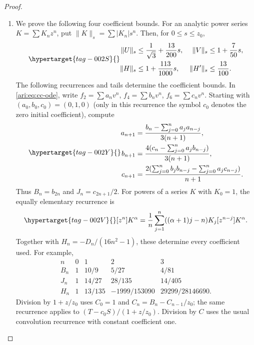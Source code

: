 \begin{proof}
\begin{enumerate}[label=\arabic*.,leftmargin=*]
\item We prove the following four coefficient bounds. For an analytic
power series $K=\sum K_nz^n$, put
$\|K\|_s=\sum|K_n|s^n$. Then, for $0\le s\le z_0$,
\begin{equation}\hypertarget{tag-002S}{}\label{ari:eq:cc-norms}
 \begin{aligned}
 \|U\|_s&\le\frac1{\sqrt3}+\frac{13}{200}s,&
 \|V\|_s&\le1+\frac7{50}s,\\
 \|H\|_s&\le1+\frac{113}{1000}s,&
 \|H'\|_s&\le\frac{13}{100}.
 \end{aligned}
\end{equation}
The following recurrences and tails determine the coefficient
bounds. In
\eqref{ari:eq:cc-ode}, write $f_2=\sum a_nv^n$,
$f_4=\sum b_nv^n$, $f_6=\sum c_nv^n$. Starting with
$(a_0,b_0,c_0)=(0,1,0)$ (only in this recurrence the symbol
$c_0$ denotes the zero initial coefficient), compute
\begin{equation}\hypertarget{tag-002Y}{}\label{ari:eq:cc-recurrence}
 \begin{aligned}
 a_{n+1}&=\frac{b_n-\sum_{j=0}^na_ja_{n-j}}{3(n+1)},\\
 b_{n+1}&=\frac{4(c_n-\sum_{j=0}^na_jb_{n-j})}{3(n+1)},\\
 c_{n+1}&=\frac{2(\sum_{j=0}^nb_jb_{n-j}-
                          \sum_{j=0}^na_jc_{n-j})}{n+1}.
 \end{aligned}
\end{equation}
Thus $B_n=b_{2n}$ and $J_n=c_{2n+1}/2$. For powers of a series
$K$ with $K_0=1$, the equally elementary recurrence is
\begin{equation}\hypertarget{tag-002V}{}\label{ari:eq:cc-power}
 [z^n]K^\alpha=\frac1n\sum_{j=1}^n
                 ((\alpha+1)j-n)K_j[z^{n-j}]K^\alpha.
\end{equation}
Together with $H_n=-D_n/(16n^2-1)$, these determine every
coefficient used. For example,
\[
 \begin{array}{c|rrrr}
 n&0&1&2&3\\ \hline
 B_n&1&10/9&5/27&4/81\\
 J_n&1&14/27&28/135&14/405\\
 H_n&1&13/135&-1999/153090&29299/28146690.
 \end{array}
\]
Division by $1+z/z_0$ uses $C_0=1$ and
$C_n=B_n-C_{n-1}/z_0$; the same recurrence applies to
$(T-c_0S)/(1+z/z_0)$. Division by $C$ uses the usual
convolution recurrence with constant coefficient one.


\end{enumerate}
\end{proof}
